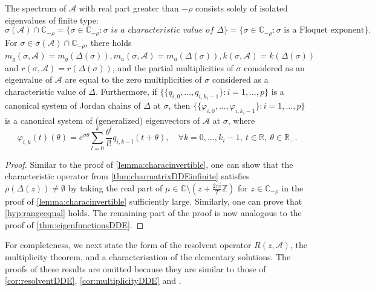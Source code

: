 \documentclass[english]{myarticle}
\begin{document}
\begin{sloppypar}
\begin{theorem} \label{thm:eigenfunctionsDDEinfinite}
The spectrum of $\mathcal{A}$ with real part greater than $-\rho$ consists solely of isolated eigenvalues of finite type:
\begin{equation*}
    \sigma(\mathcal{A}) \cap \mathbb{C}_{-\rho} =  \{ \sigma \in \mathbb{C}_{-\rho} :  \sigma \textit{ is a characteristic value of } \Delta \}  =  \{\sigma \in \mathbb{C}_{-\rho} :  \sigma \mbox{ is a Floquet exponent} \}.
\end{equation*}
For $\sigma \in \sigma(\mathcal{A}) \cap \mathbb{C}_{-\rho}$, there holds $m_g(\sigma,\mathcal{A}) = m_g(\Delta(\sigma)), m_a(\sigma,\mathcal{A}) = m_a(\Delta(\sigma)), k(\sigma,\mathcal{A}) = k(\Delta(\sigma))$ and $r(\sigma,\mathcal{A}) = r(\Delta(\sigma))$, and the partial multiplicities of $\sigma$ considered as an eigenvalue of $\mathcal{A}$ are equal to the zero multiplicities of $\sigma$ considered as a characteristic value of $\Delta$. Furthermore, if $\{ \{{q}_{i,0},\dots,{q}_{i,k_i-1} \} : i=1,\dots,p\}$ is a canonical system of Jordan chains of $\Delta$ at $\sigma$, then $\{ \{\varphi_{i,0},\dots,\varphi_{i,k_i-1} \} : i=1,\dots,p \}$ is a canonical system of (generalized) eigenvectors of $\mathcal{A}$ at $\sigma$, where
\begin{equation*}
    \varphi_{i,k}(t)(\theta) = e^{\sigma \theta} \sum_{l=0}^k \frac{\theta^l}{l!}q_{i,k-l}(t+\theta), \quad \forall k = 0,\dots,k_{i}-1, \ t \in \mathbb{R}, \ \theta \in \mathbb{R}_{-}.
\end{equation*}
\end{theorem}
\begin{proof}
Similar to the proof of \cref{lemma:characinvertible}, one can show that the characteristic operator from \cref{thm:charmatrixDDEinfinite} satisfies $\rho(\Delta(z)) \neq \emptyset$ by taking the real part of $\mu \in \mathbb{C} \setminus (z + \frac{2 \pi i}{T}\mathbb{Z})$ for $z \in \mathbb{C}_{-\rho}$ in the proof of \cref{lemma:characinvertible} sufficiently large. Similarly, one can prove that \ref{hyp:rangeequal} holds. The remaining part of the proof is now analogous to the proof of \cref{thm:eigenfunctionsDDE}.
\end{proof}

For completeness, we next state the form of the resolvent operator $R(z, \mathcal{A})$, the multiplicity theorem, and a characterisation of the elementary solutions. The proofs of these results are omitted because they are similar to those of \cref{cor:resolventDDE}, \cref{cor:multiplicityDDE} and .


\end{sloppypar}
\end{document}
